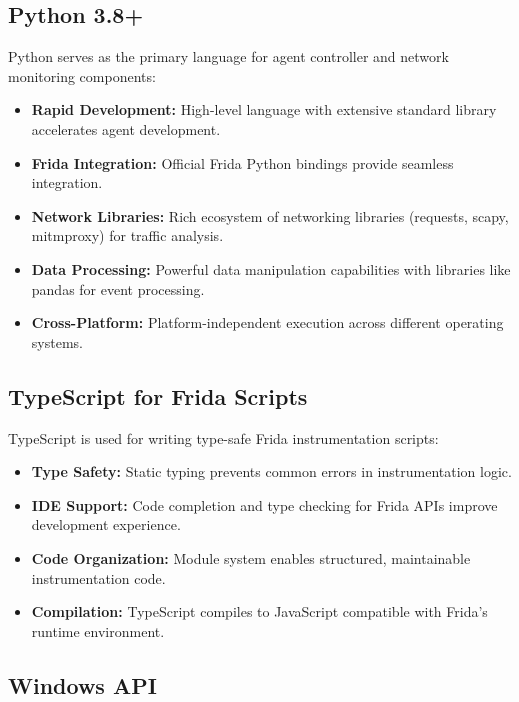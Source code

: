 \subsection{Python 3.8+}

Python serves as the primary language for agent controller and network monitoring components:

\begin{itemize}
    \item \textbf{Rapid Development:} High-level language with extensive standard library accelerates agent development.
    \item \textbf{Frida Integration:} Official Frida Python bindings provide seamless integration.
    \item \textbf{Network Libraries:} Rich ecosystem of networking libraries (requests, scapy, mitmproxy) for traffic analysis.
    \item \textbf{Data Processing:} Powerful data manipulation capabilities with libraries like pandas for event processing.
    \item \textbf{Cross-Platform:} Platform-independent execution across different operating systems.
\end{itemize}

\subsection{TypeScript for Frida Scripts}

TypeScript is used for writing type-safe Frida instrumentation scripts:

\begin{itemize}
    \item \textbf{Type Safety:} Static typing prevents common errors in instrumentation logic.
    \item \textbf{IDE Support:} Code completion and type checking for Frida APIs improve development experience.
    \item \textbf{Code Organization:} Module system enables structured, maintainable instrumentation code.
    \item \textbf{Compilation:} TypeScript compiles to JavaScript compatible with Frida's runtime environment.
\end{itemize}

\subsection{Windows API}

